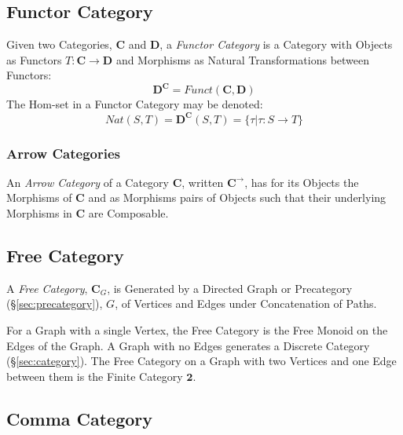 \subsection{Functor Category}\label{sec:functor_category}

Given two Categories, $\mathbf{C}$ and $\mathbf{D}$, a \emph{Functor
  Category} is a Category with Objects as Functors $T : \mathbf{C}
\rightarrow \mathbf{D}$ and Morphisms as Natural Transformations
between Functors:
\[
    \mathbf{D}^{\mathbf{C}} = Funct(\mathbf{C},\mathbf{D})
\]
The Hom-set in a Functor Category may be denoted:
\[
    Nat(S,T) = \mathbf{D}^{\mathbf{C}}(S,T) =
        \{ \tau | \tau : S \rightarrow T \}
\]



\subsubsection{Arrow Categories}\label{sec:arrow_categories}

An \emph{Arrow Category} of a Category $\mathbf{C}$, written
$\mathbf{C^{\rightarrow}}$, has for its Objects the Morphisms of
$\mathbf{C}$ and as Morphisms pairs of Objects such that their
underlying Morphisms in $\mathbf{C}$ are Composable.



\subsection{Free Category}\label{sec:free_category}

A \emph{Free Category}, $\mathbf{C}_G$, is Generated by a Directed
Graph or Precategory (\S\ref{sec:precategory}), $G$, of Vertices
and Edges under Concatenation of Paths.

For a Graph with a single Vertex, the Free Category is the Free Monoid
on the Edges of the Graph. A Graph with no Edges generates a Discrete
Category (\S\ref{sec:category}). The Free Category on a Graph with
two Vertices and one Edge between them is the Finite Category
$\mathbf{2}$.



\subsection{Comma Category}\label{sec:comma_category}

